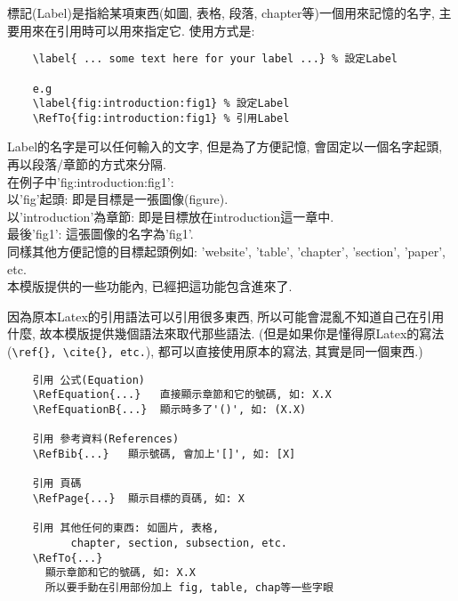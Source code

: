 標記(Label)是指給某項東西(如圖, 表格, 段落, chapter等)一個用來記憶的名字, 主要用來在引用時可以用來指定它. 使用方式是:

  \EmptyLine
  \begin{fmpage}{\textwidth}
  \begin{verbatim}
    \label{ ... some text here for your label ...} % 設定Label

    e.g
    \label{fig:introduction:fig1} % 設定Label
    \RefTo{fig:introduction:fig1} % 引用Label
  \end{verbatim}
  \end{fmpage}
  \EmptyLine

\noindent Label的名字是可以任何輸入的文字, 但是為了方便記憶, 會固定以一個名字起頭, 再以段落/章節的方式來分隔.\\

\noindent 在例子中'fig:introduction:fig1':\\
以'fig'起頭: 即是目標是一張圖像(figure).\\
以'introduction'為章節: 即是目標放在introduction這一章中.\\
最後'fig1': 這張圖像的名字為'fig1'.\\

\noindent 同樣其他方便記憶的目標起頭例如: 'website', 'table', 'chapter', 'section', 'paper', etc.\\

\noindent 本模版提供的一些功能內, 已經把這功能包含進來了.

\newpage
{}
因為原本Latex的引用語法可以引用很多東西, 所以可能會混亂不知道自己在引用什麼, 故本模版提供幾個語法來取代那些語法. (但是如果你是懂得原Latex的寫法(\verb|\ref{}, \cite{}, etc.|), 都可以直接使用原本的寫法, 其實是同一個東西.)

  \EmptyLine
  \begin{fmpage}{\textwidth}
  \begin{verbatim}
    引用 公式(Equation)
    \RefEquation{...}   直接顯示章節和它的號碼, 如: X.X
    \RefEquationB{...}  顯示時多了'()', 如: (X.X)

    引用 參考資料(References)
    \RefBib{...}   顯示號碼, 會加上'[]', 如: [X]

    引用 頁碼
    \RefPage{...}  顯示目標的頁碼, 如: X

    引用 其他任何的東西: 如圖片, 表格,
          chapter, section, subsection, etc.
    \RefTo{...}
      顯示章節和它的號碼, 如: X.X
      所以要手動在引用部份加上 fig, table, chap等一些字眼
  \end{verbatim}
  \end{fmpage}

